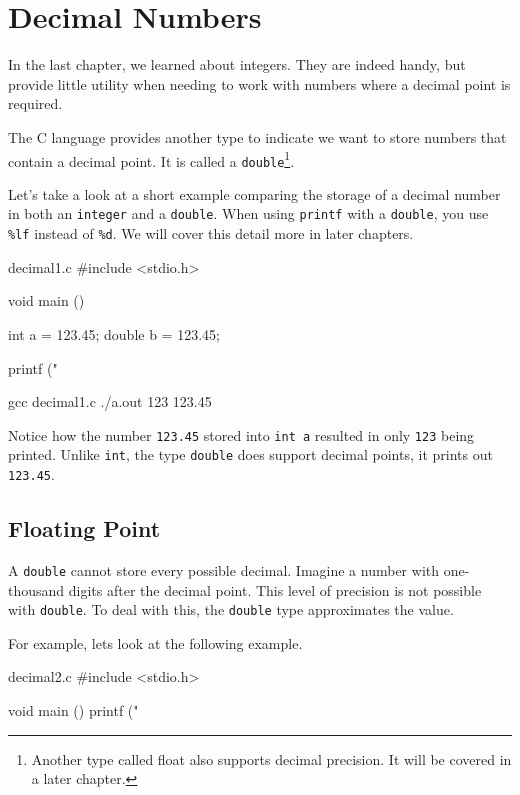 \chapter{Decimal Numbers}

In the last chapter, we learned about integers. They are indeed handy, but
provide little utility when needing to work with numbers where a decimal point
is required.

The C language provides another type to indicate we want to store numbers that
contain a decimal point. It is called a \verb|double|\footnote{Another type
called float also supports decimal precision. It will be covered in a later
chapter.}.

Let's take a look at a short example comparing the storage of a decimal number
in both an \verb|integer| and a \verb|double|. When using \verb|printf| with a
\verb|double|, you use \verb|%lf| instead of \verb|%d|. We will cover this
detail more in later chapters.

\begin{code}{decimal1.c}
#include <stdio.h>

void main ()
{
    int a = 123.45;
    double b = 123.45;

    printf ("%
}
\end{code}

\begin{Terminal}
gcc decimal1.c
./a.out
123 123.45
\end{Terminal}

Notice how the number \verb|123.45| stored into \verb|int a| resulted in only
\verb|123| being printed. Unlike \verb|int|, the type \verb|double| does
support decimal points, it prints out \verb|123.45|.


\section{Floating Point}

A \verb|double| cannot store every possible decimal. Imagine a number with
one-thousand digits after the decimal point. This level of precision is not
possible with \verb|double|. To deal with this, the \verb|double| type
approximates the value.

For example, lets look at the following example.

\begin{code}{decimal2.c}
#include <stdio.h>

void main ()
{
    printf ("%
}
\end{code}

